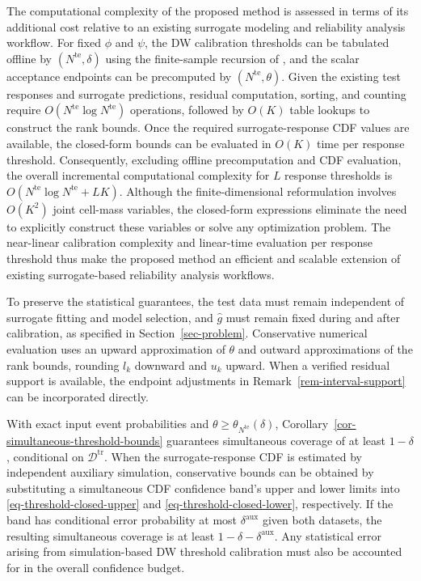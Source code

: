 \documentclass[review,11pt,3p,authoryear,nopreprintline]{elsarticle}
\begin{document}
The computational complexity of the proposed method is assessed in terms of its additional cost relative to an existing surrogate modeling and reliability analysis workflow. For fixed $\phi$ and $\psi$, the DW calibration thresholds can be tabulated offline by $(N^{\mathrm{te}},\delta)$ using the finite-sample recursion of \citet[Supplement, Section~S.7]{L.J23}, and the scalar acceptance endpoints can be precomputed by $(N^{\mathrm{te}},\theta)$. Given the existing test responses and surrogate predictions, residual computation, sorting, and counting require $O(N^{\mathrm{te}}\log N^{\mathrm{te}})$ operations, followed by $O(K)$ table lookups to construct the rank bounds. Once the required surrogate-response CDF values are available, the closed-form bounds can be evaluated in $O(K)$ time per response threshold. Consequently, excluding offline precomputation and CDF evaluation, the overall incremental computational complexity for $L$ response thresholds is $O(N^{\mathrm{te}}\log N^{\mathrm{te}}+LK)$. Although the finite-dimensional reformulation involves $O(K^2)$ joint cell-mass variables, the closed-form expressions eliminate the need to explicitly construct these variables or solve any optimization problem. The near-linear calibration complexity and linear-time evaluation per response threshold thus make the proposed method an efficient and scalable extension of existing surrogate-based reliability analysis workflows.

To preserve the statistical guarantees, the test data must remain independent of surrogate fitting and model selection, and $\hat g$ must remain fixed during and after calibration, as specified in Section~\ref{sec-problem}. Conservative numerical evaluation uses an upward approximation of $\theta$ and outward approximations of the rank bounds, rounding $l_k$ downward and $u_k$ upward. When a verified residual support is available, the endpoint adjustments in Remark~\ref{rem-interval-support} can be incorporated directly.

With exact input event probabilities and $\theta\ge\theta_{N^{\mathrm{te}}}(\delta)$, Corollary~\ref{cor-simultaneous-threshold-bounds} guarantees simultaneous coverage of at least $1-\delta$, conditional on $\mathcal D^{\mathrm{tr}}$. When the surrogate-response CDF is estimated by independent auxiliary simulation, conservative bounds can be obtained by substituting a simultaneous CDF confidence band's upper and lower limits into \eqref{eq-threshold-closed-upper} and \eqref{eq-threshold-closed-lower}, respectively. If the band has conditional error probability at most $\delta^{\mathrm{aux}}$ given both datasets, the resulting simultaneous coverage is at least $1-\delta-\delta^{\mathrm{aux}}$. Any statistical error arising from simulation-based DW threshold calibration must also be accounted for in the overall confidence budget.



\end{document}
